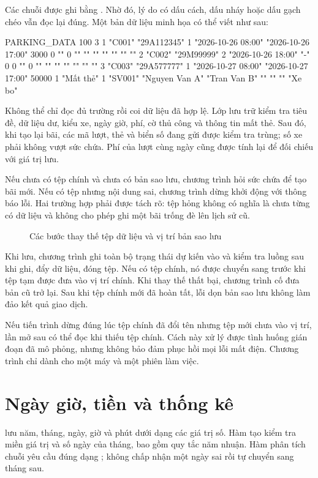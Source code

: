 Các chuỗi được ghi bằng . Nhờ đó, lý do có dấu cách, dấu nháy hoặc dấu gạch chéo vẫn đọc lại đúng. Một bản dữ liệu minh họa có thể viết như sau:

\begin{Code}
PARKING_DATA 100 3
1 "C001" "29A112345" 1 "2026-10-26 08:00" "2026-10-26 17:00" 3000 0 "" 0 "" "" "" "" "" "" ""
2 "C002" "29M99999" 2 "2026-10-26 18:00" "-" 0 0 "" 0 "" "" "" "" "" "" ""
3 "C003" "29A577777" 1 "2026-10-27 08:00" "2026-10-27 17:00" 50000 1 "Mất thẻ" 1 "SV001" "Nguyen Van A" "Tran Van B" "" "" "" "Xe bo"
\end{Code}

Không thể chỉ đọc đủ trường rồi coi dữ liệu đã hợp lệ. Lớp lưu trữ kiểm tra tiêu đề, dữ liệu dư, kiểu xe, ngày giờ, phí, cờ thủ công và thông tin mất thẻ. Sau đó, khi tạo lại bãi, các mã lượt, thẻ và biển số đang gửi được kiểm tra trùng; số xe phải không vượt sức chứa. Phí của lượt cùng ngày cũng được tính lại để đối chiếu với giá trị lưu.

Nếu chưa có tệp chính và chưa có bản sao lưu, chương trình hỏi sức chứa để tạo bãi mới. Nếu có tệp nhưng nội dung sai, chương trình dừng khởi động với thông báo lỗi. Hai trường hợp phải được tách rõ: tệp hỏng không có nghĩa là chưa từng có dữ liệu và không cho phép ghi một bãi trống đè lên lịch sử cũ.

\begin{figure}[H]
\centering

\caption{Các bước thay thế tệp dữ liệu và vị trí bản sao lưu}
\label{fig:storage}
\end{figure}

Khi lưu, chương trình ghi toàn bộ trạng thái dự kiến vào  và kiểm tra luồng sau khi ghi, đẩy dữ liệu, đóng tệp. Nếu có tệp chính, nó được chuyển sang  trước khi tệp tạm được đưa vào vị trí chính. Khi thay thế thất bại, chương trình cố đưa bản cũ trở lại. Sau khi tệp chính mới đã hoàn tất, lỗi dọn bản sao lưu không làm đảo kết quả giao dịch.

Nếu tiến trình dừng đúng lúc tệp chính đã đổi tên nhưng tệp mới chưa vào vị trí, lần mở sau có thể đọc  khi thiếu tệp chính. Cách này xử lý được tình huống gián đoạn đã mô phỏng, nhưng không bảo đảm phục hồi mọi lỗi mất điện. Chương trình chỉ dành cho một máy và một phiên làm việc.

\section{Ngày giờ, tiền và thống kê}
 lưu năm, tháng, ngày, giờ và phút dưới dạng các giá trị số. Hàm tạo kiểm tra miền giá trị và số ngày của tháng, bao gồm quy tắc năm nhuận. Hàm phân tích chuỗi yêu cầu đúng dạng ; không chấp nhận một ngày sai rồi tự chuyển sang tháng sau.

